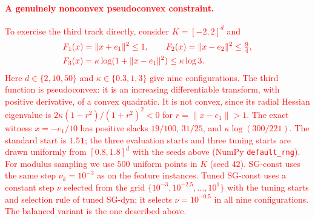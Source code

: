 \documentclass[]{interact}
\theoremstyle{plain}
\theoremstyle{definition}
\theoremstyle{remark}
\begin{document}
\paragraph*{\textcolor{red}{A genuinely nonconvex pseudoconvex constraint.}}
\leavevmode\textcolor{red}{To exercise the third track directly, consider $K=[-2,2]^d$ and}
\begin{equation}\label{eq:logball-test}\textcolor{red}{
\begin{aligned}
 F_1(x)&=\|x+e_1\|^2\le1,\qquad
 F_2(x)=\|x-e_2\|^2\le\tfrac94,\\
 F_3(x)&=\kappa\log(1+\|x-e_1\|^2)\le \kappa\log3.
\end{aligned}
}\end{equation}
\leavevmode\textcolor{red}{Here $d\in\{2,10,50\}$ and $\kappa\in\{0.3,1,3\}$ give nine configurations.
The third function is pseudoconvex: it is an increasing differentiable
transform, with positive derivative, of a convex quadratic. It is not
convex, since its radial Hessian eigenvalue is
$2\kappa(1-r^2)/(1+r^2)^2<0$ for $r=\|x-e_1\|>1$.
The exact witness $x=-e_1/10$ has positive slacks
$19/100$, $31/25$, and $\kappa\log(300/221)$.
The standard start is $1.5\mathbf1$; the three evaluation starts and three
tuning starts are drawn uniformly from $[0.8,1.8]^d$ with the seeds above
(NumPy \texttt{default\_rng}).
For modulus sampling we use $500$ uniform points in $K$ (seed $42$).
SG-const uses the same step $\nu_k=10^{-3}$ as on the feature instances. Tuned
SG-const uses a constant step $\nu$ selected from the grid
$\{10^{-3},10^{-2.5},\ldots,10^1\}$ with the tuning starts and selection rule of
tuned SG-dyn; it selects $\nu=10^{-0.5}$ in all nine configurations. The balanced
variant is the one described above.}
\end{document}
